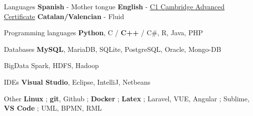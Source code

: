 

\begin{cvskills}
  \cvskill
    {Languages} %
    {\textbf{Spanish} - Mother tongue \acvHeaderSocialSep \textbf{English} - \href{https://bit.ly/48MClKA}{C1 Cambridge Advanced Certificate}  \acvHeaderSocialSep \textbf{Catalan/Valencian} - Fluid} %
    
  \cvskill
	{Programming languages} %
	{\textbf{Python},  C / \textbf{C++} / C\#,  R,  Java,  PHP} %
	
  \cvskill
	{Databases} %
	{\textbf{MySQL},  MariaDB,  SQLite,  PostgreSQL,  Oracle,  Mongo-DB} %
	
  \cvskill
	{BigData} %
	{Spark, HDFS, Hadoop} %
	
  \cvskill
	{IDEs} %
	{\textbf{Visual Studio},  Eclipse,  IntelliJ,  Netbeans} %

		
  \cvskill
	{Other} %
	{\textbf{Linux} ; \textbf{git}, Github ; \textbf{Docker} ; \textbf{Latex} ;  Laravel, VUE, Angular ; Sublime, \textbf{VS Code} ; UML,  BPMN,  RML} %
\end{cvskills}

